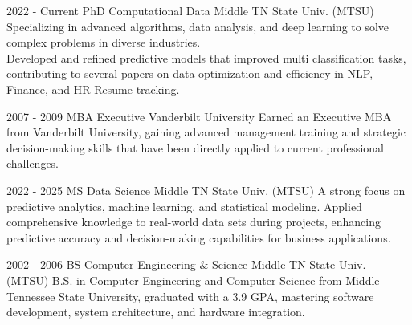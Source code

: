 \newpage
{}

\cvmetaevent
{2022 - Current}
{PhD Computational Data}
{Middle TN State Univ. (MTSU)}
{
Specializing in advanced algorithms, data analysis, and deep learning to solve complex problems in diverse industries.\\

Developed and refined predictive models that improved multi classification tasks, contributing to several papers on data optimization and efficiency in NLP, Finance, and HR Resume tracking.
}

\vfill\null
\cvmetaevent
{2007 - 2009}
{MBA Executive}
{Vanderbilt University}
{
Earned an Executive MBA from Vanderbilt University, gaining advanced management training and strategic decision-making skills that have been directly applied to current professional challenges.
}

\vfill\null
\cvmetaevent
{2022 - 2025}
{MS Data Science}
{Middle TN State Univ. (MTSU)}
{
A strong focus on predictive analytics, machine learning, and statistical modeling. Applied comprehensive knowledge to real-world data sets during projects, enhancing predictive accuracy and decision-making capabilities for business applications.
}

\vfill\null
\cvmetaevent
{2002 - 2006}
{BS Computer Engineering \& Science}
{Middle TN State Univ. (MTSU)}
{
B.S. in Computer Engineering and Computer Science from Middle Tennessee State University, graduated with a 3.9 GPA, mastering software development, system architecture, and hardware integration.
}

